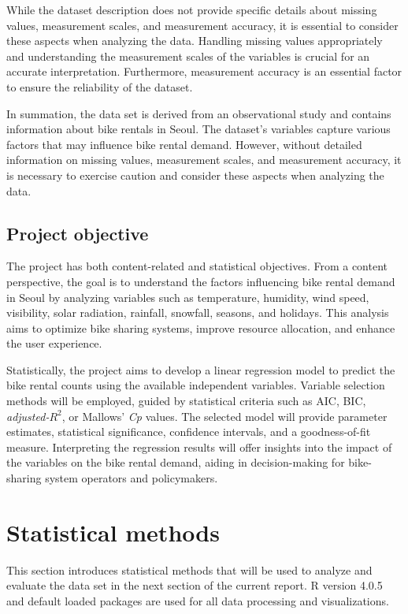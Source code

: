 \documentclass[12 pt]{scrartcl}
\begin{document}
While the dataset description does not provide specific details about missing values, measurement scales, and measurement accuracy, it is essential to consider these aspects when analyzing the data. Handling missing values appropriately and understanding the measurement scales of the variables is crucial for an accurate interpretation. Furthermore, measurement accuracy is an essential factor to ensure the reliability of the dataset. 

In summation, the data set is derived from an observational study and contains information about bike rentals in Seoul. The dataset's variables capture various factors that may influence bike rental demand. However, without detailed information on missing values, measurement scales, and measurement accuracy, it is necessary to exercise caution and consider these aspects when analyzing the data.


\subsection{Project objective}

The project has both content-related and statistical objectives. From a content perspective, the goal is to understand the factors influencing bike rental demand in Seoul by analyzing variables such as temperature, humidity, wind speed, visibility, solar radiation, rainfall, snowfall, seasons, and holidays. This analysis aims to optimize bike sharing systems, improve resource allocation, and enhance the user experience. 

Statistically, the project aims to develop a linear regression model to predict the bike rental counts using the available independent variables. Variable selection methods will be employed, guided by statistical criteria such as AIC, BIC, \emph{adjusted-${R^2}$}, or Mallows' \emph{Cp} values. The selected model will provide parameter estimates, statistical significance, confidence intervals, and a goodness-of-fit measure. Interpreting the regression results will offer insights into the impact of the variables on the bike rental demand, aiding in decision-making for bike-sharing system operators and policymakers.
 


\section{Statistical methods}

This section introduces statistical methods that will be used to analyze and evaluate the data set in the next section of the current report. R \citep{R} version 4.0.5 and default loaded packages are used for all data processing and visualizations.
\end{document}
